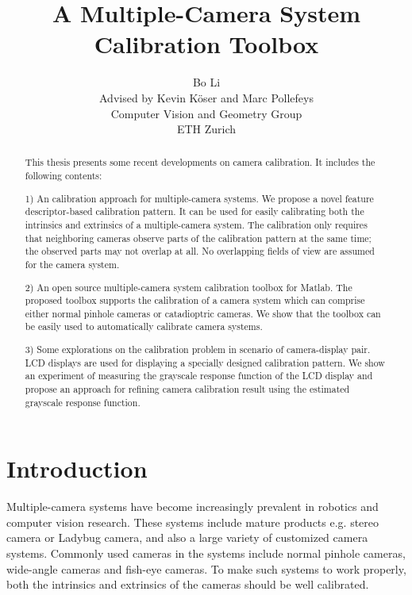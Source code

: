 \documentclass{report}
\title{\LARGE \bf
A Multiple-Camera System Calibration Toolbox
}
\author{
Bo Li \\ Advised by Kevin K\"oser and Marc Pollefeys\\
Computer Vision and Geometry Group\\ ETH Zurich
}
\begin{document}
\maketitle
\tableofcontents

\begin{abstract}
This thesis presents some recent developments on camera calibration. It includes the following contents: 

1) An calibration approach for multiple-camera systems. We propose a novel feature descriptor-based calibration pattern. It can be used for easily calibrating both the intrinsics and extrinsics of a multiple-camera system. The calibration only requires that neighboring cameras observe parts of the calibration pattern at the same time; the observed parts may not overlap at all. No overlapping fields of view are assumed for the camera system.

2) An open source multiple-camera system calibration toolbox for Matlab. The proposed toolbox supports the calibration of a camera system which can comprise either normal pinhole cameras or catadioptric cameras. We show that the toolbox can be easily used to automatically calibrate camera systems. 

3) Some explorations on the calibration problem in scenario of camera-display pair. LCD displays are used for displaying a specially designed calibration pattern. We show an experiment of measuring the grayscale response function of the LCD display and propose an approach for refining camera calibration result using the estimated grayscale response function. 


\end{abstract}



\chapter{Introduction}
Multiple-camera systems have become increasingly prevalent in robotics and computer vision research. These systems include mature products e.g. stereo camera or Ladybug camera, and also a large variety of customized camera systems. Commonly used cameras in the systems include normal pinhole cameras, wide-angle cameras and fish-eye cameras. To make such systems to work properly, both the intrinsics and extrinsics of the cameras should be well calibrated. 
\end{document}
